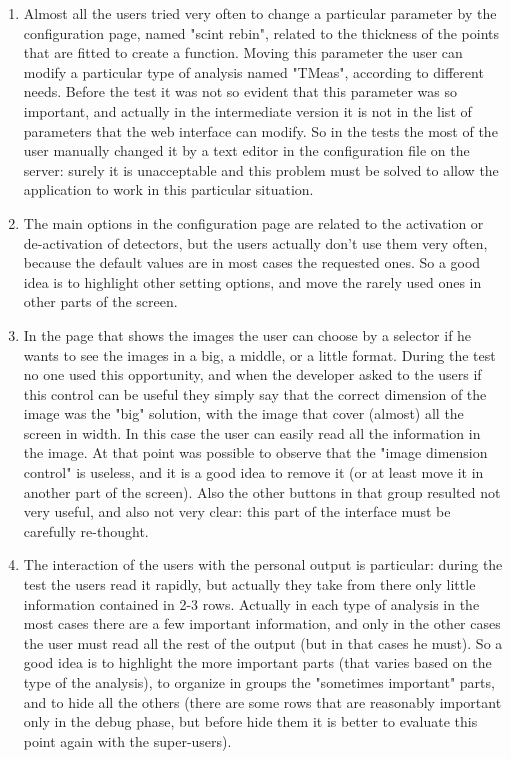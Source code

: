 \begin{enumerate}

\item
Almost all the users tried very often to change a particular parameter by the configuration page, named "scint rebin", related to the thickness of the points that are fitted to create a function. Moving this parameter the user can modify a particular type of analysis named "TMeas", according to different needs. Before the test it was not so evident that this parameter was so important, and actually in the intermediate version it is not in the list of parameters that the web interface can modify. So in the tests the most of the user manually changed it by a text editor in the configuration file on the server: surely it is unacceptable and this problem must be solved to allow the application to work in this particular situation.

\item 
The main options in the configuration page are related to the activation or de-activation of detectors, but the users actually don't use them very often, because  the default values are in most cases the requested ones. So a good idea is to highlight other setting options, and move the rarely used ones in other parts of the screen.

\item
In the page that shows the images the user can choose by a selector if he wants to see the images in a big, a middle, or a little format. During the test no one used this opportunity, and when the developer asked to the users if this control can be useful they simply say that the correct dimension of the image was the "big" solution, with the image that cover (almost) all the screen in width. In this case the user can easily read all the information in the image. At that point was possible to observe that the "image dimension control" is useless, and it is a good idea to remove it (or at least move it in another part of the screen). Also the other buttons in that group resulted not very useful, and also not very clear: this part of the interface must be carefully re-thought.   


\item
The interaction of the users with the personal output is particular: during the test the users read it rapidly, but actually they take from there only little information contained in 2-3 rows. Actually in each type of analysis in the most cases there are a few important information, and only in the other cases the user must read all the rest of the output (but in that cases he must). So a good idea is to highlight the more important parts (that varies based on the type of the analysis), to organize in groups the "sometimes important" parts, and to hide all the others (there are some rows that are reasonably important only in the debug phase, but before hide them it is better to evaluate this point again with the super-users).


\end{enumerate}
